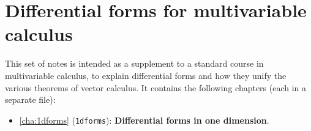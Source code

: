 \ifdefined\inmaster\else\def\subonly{\jobname}\fi

\chapter{Differential forms for multivariable calculus}

This set of notes is intended as a supplement to a standard course in multivariable calculus, to explain differential forms and how they unify the various theorems of vector calculus.
It contains the following chapters (each in a separate file):
\begin{itemize}
\item \cref{cha:1dforms} (\texttt{1dforms}): \textbf{Differential forms in one dimension}.
\end{itemize}